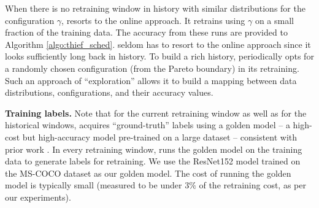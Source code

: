 When there is no retraining window in history with similar distributions for the configuration $\gamma$, {\name} resorts to the online approach. It retrains using $\gamma$ on a small fraction of the training data. The accuracy from these runs are provided to Algorithm \ref{algo:thief_sched}. \name seldom has to resort to the online approach since it looks sufficiently long back in history. 
To build a rich history, \name periodically opts for a randomly chosen configuration (from the Pareto boundary) in its retraining. Such an approach of ``exploration'' allows it to build a mapping between data distributions, configurations, and their accuracy values. 

{\bf Training labels.} Note that for the current retraining window as well as for the historical windows, {\name} acquires ``ground-truth'' labels using a golden model -- a high-cost but high-accuracy model pre-trained on a large dataset -- consistent with prior work \cite{incremental-13, mullapudi2019, incremental-15, distribution-20}. In every retraining window, {\name} runs the golden model on the training data to generate labels for retraining. We use the ResNet152 model trained on the MS-COCO dataset as our golden model. The cost of running the golden model is typically small (measured to be under $3\%$ of the retraining cost, as per our experiments).



